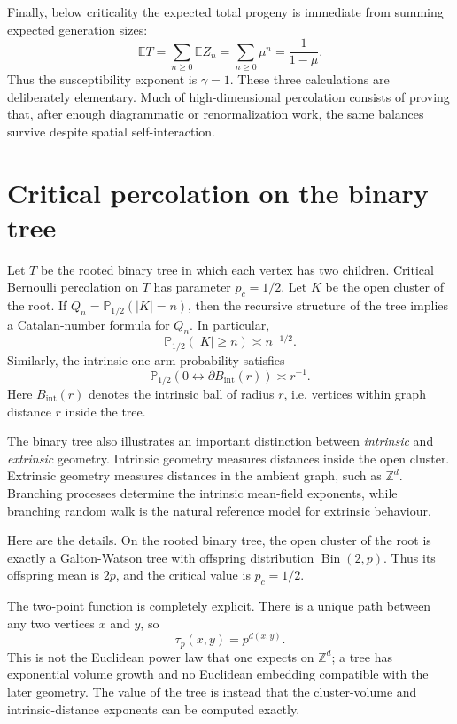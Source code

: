 \documentclass[11pt,reqno]{book}
\numberwithin{equation}{chapter}
\theoremstyle{plain}
\theoremstyle{definition}
\theoremstyle{remark}
\renewcommand{\P}{\mathbb P}
\newcommand{\E}{\mathbb E}
\newcommand{\Z}{\mathbb Z}
\newcommand{\1}{\mathbf 1}
\newcommand{\as}{\asymp}
\begin{document}
Finally, below criticality the expected total progeny is immediate from summing expected generation sizes:
\[
  \E T=\sum_{n\geq 0}\E Z_n=\sum_{n\geq 0}\mu^n=\frac1{1-\mu}.
\]
Thus the susceptibility exponent is $\gamma=1$. These three calculations are deliberately elementary. Much of high-dimensional percolation consists of proving that, after enough diagrammatic or renormalization work, the same balances survive despite spatial self-interaction.

\section{Critical percolation on the binary tree}

Let $T$ be the rooted binary tree in which each vertex has two children. Critical Bernoulli percolation on $T$ has parameter $p_c=1/2$. Let $K$ be the open cluster of the root. If $Q_n=\P_{1/2}(|K|=n)$, then the recursive structure of the tree implies a Catalan-number formula for $Q_n$. In particular,
\[
  \P_{1/2}(|K|\geq n)\as n^{-1/2}.
\]
Similarly, the intrinsic one-arm probability satisfies
\[
  \P_{1/2}(0\leftrightarrow \partial B_{\mathrm{int}}(r))\as r^{-1}.
\]
Here $B_{\mathrm{int}}(r)$ denotes the intrinsic ball of radius $r$, i.e. vertices within graph distance $r$ inside the tree.

The binary tree also illustrates an important distinction between \emph{intrinsic} and \emph{extrinsic} geometry. Intrinsic geometry measures distances inside the open cluster. Extrinsic geometry measures distances in the ambient graph, such as $\Z^d$. Branching processes determine the intrinsic mean-field exponents, while branching random walk is the natural reference model for extrinsic behaviour.

Here are the details. On the rooted binary tree, the open cluster of the root is exactly a Galton-Watson tree with offspring distribution $\operatorname{Bin}(2,p)$. Thus its offspring mean is $2p$, and the critical value is $p_c=1/2$.

The two-point function is completely explicit. There is a unique path between any two vertices $x$ and $y$, so
\[
  \tau_p(x,y)=p^{d(x,y)}.
\]
This is not the Euclidean power law that one expects on $\Z^d$; a tree has exponential volume growth and no Euclidean embedding compatible with the later geometry. The value of the tree is instead that the cluster-volume and intrinsic-distance exponents can be computed exactly.
\end{document}
